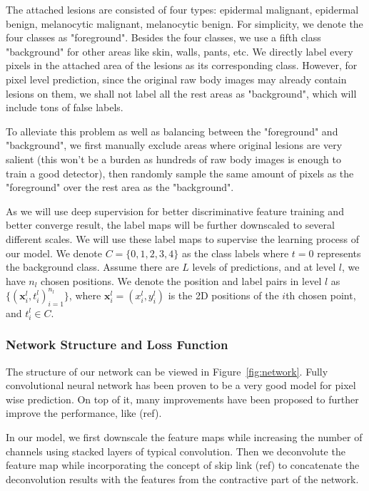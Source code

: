 \documentclass[letterpaper]{article}
\begin{document}
The attached lesions are consisted of four types: epidermal malignant, epidermal benign, melanocytic malignant, melanocytic benign. For simplicity, we denote the four classes as "foreground". Besides the four classes, we use a fifth class "background" for other areas like skin, walls, pants, etc. We directly label every pixels in the attached area of the lesions as its corresponding class. However, for pixel level prediction, since the original raw body images may already contain lesions on them, we shall not label all the rest areas as "background", which will include tons of false labels.

To alleviate this problem as well as balancing between the "foreground" and "background", we first manually exclude areas where original lesions are very salient (this won't be a burden as hundreds of raw body images is enough to train a good detector), then randomly sample the same amount of pixels as the "foreground" over the rest area as the "background".

As we will use deep supervision for better discriminative feature training and better converge result, the label maps will be further downscaled to several different scales. We will use these label maps to supervise the learning process of our model. We denote $C = \{0, 1, 2, 3, 4\}$ as the class labels where $t = 0$ represents the background class. Assume there are $L$ levels of predictions, and at level $l$, we have $n_l$ chosen positions. We denote the position and label pairs in level $l$ as $\{(\mathbf{x}_i^l, t_i^l)^{n_l}_{i=1}\}$, where $\mathbf{x}_i^l = (x_i^l, y_i^l)$ is the 2D positions of the $i$th chosen point, and $t_i^l \in C$.

\subsubsection{Network Structure and Loss Function}

The structure of our network can be viewed in Figure~\ref{fig:network}. Fully convolutional neural network has been proven to be a very good model for pixel wise prediction. On top of it, many improvements have been proposed to further improve the performance, like (ref). 

In our model, we first downscale the feature maps while increasing the number of channels using stacked layers of typical convolution. Then we deconvolute the feature map while incorporating the concept of skip link (ref) to concatenate the deconvolution results with the features from the contractive part of the network.
\end{document}
